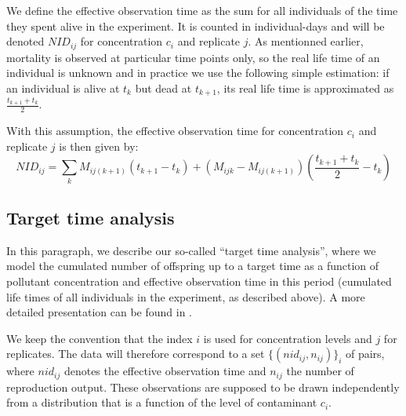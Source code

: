 \documentclass{article}
\begin{document}
We define the effective observation time as the sum for all
individuals of the time they spent alive in the experiment. It is
counted in individual-days and will be denoted $NID_{ij}$ for
concentration $c_i$ and replicate $j$. As mentionned earlier,
mortality is observed at particular time points only, so the real life
time of an individual is unknown and in practice we use the following
simple estimation: if an individual is alive at $t_k$
but dead at $t_{k+1}$, its real life time is approximated as
$\frac{t_{k+1}+t_k}{2}$.

With this assumption, the effective observation time for concentration
$c_i$ and replicate $j$ is then given by:
$$
NID_{ij} =   \sum_k M_{ij(k+1)} (t_{k+1} - t_k)
           + (M_{ijk} - M_{ij(k+1)})(\frac{t_{k+1}+t_k}{2} - t_k)
$$

\subsection{Target time analysis}
In this paragraph, we describe our so-called ``target time analysis'',
where we model the cumulated number of offspring up to a target time
as a function of pollutant concentration and effective observation
time in this period (cumulated life times of all individuals in the
experiment, as described above). A more detailed presentation can be
found in \cite{delignette2014}.

We keep the convention that the index $i$ is used for concentration
levels and $j$ for replicates. The data will therefore correspond to a
set $\{(nid_{ij}, n_{ij})\}_i$ of pairs, where $nid_{ij}$ denotes the
effective observation time and $n_{ij}$ the number of reproduction
output. These observations are supposed to be drawn independently from
a distribution that is a function of the level of contaminant $c_i$.
\end{document}
